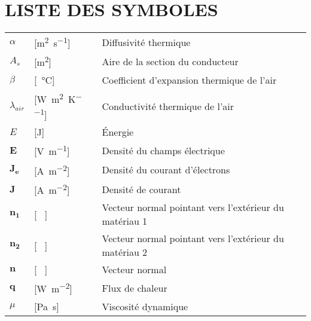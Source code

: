 \chapter*{LISTE DES SYMBOLES}
\pagestyle{pagenumber}
%

%
\begin{longtable}{l p{2.5cm} p{4in}}
	$\alpha$         & [\si{\square\metre\per\second}]                     & Diffusivité thermique                                        \\
	$A_s$            & [\si{\square\metre}]                                & Aire de la section du conducteur                             \\
	$\beta$          & [\si{\per\celsius}]                                 & Coefficient d'expansion thermique de l'air                   \\
	$\lambda_{air}$  & [\si{\watt\per\square\metre\per\kelvin}]            & Conductivité thermique de l'air                              \\
	$E$              & [\si{\joule}]                                       & Énergie                                                      \\
	$\mathbf{E}$     & [\si{\volt\per\metre}]                              & Densité du champs électrique                                 \\
	$\mathbf{J_e}$   & [\si{\ampere\per\square\metre}]                     & Densité du courant d'électrons                               \\
	$\mathbf{J}$     & [\si{\ampere\per\square\metre}]                     & Densité de courant                                           \\
	$\mathbf{n_1}$   & [ \ ]                                               & Vecteur normal pointant vers l'extérieur du matériau 1       \\
	$\mathbf{n_2}$   & [ \ ]                                               & Vecteur normal pointant vers l'extérieur du matériau 2       \\
	$\mathbf{n}$     & [ \ ]                                               & Vecteur normal                                               \\
	$\mathbf{q}$     & [\si{\watt\per\square\metre}]                       & Flux de chaleur                                              \\
	$\mu$            & [\si{\pascal\second}]                               & Viscosité dynamique                                          \\

\end{longtable}
